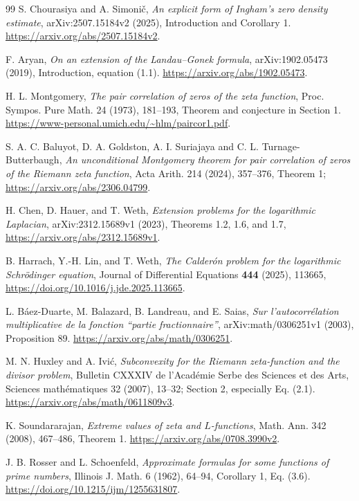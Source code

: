 \documentclass[11pt]{article}
\theoremstyle{remark}
\begin{document}
\begin{thebibliography}{99}
S. Chourasiya and A. Simoni\v{c},
\emph{An explicit form of Ingham's zero density estimate},
arXiv:2507.15184v2 (2025), Introduction and Corollary 1.
\url{https://arxiv.org/abs/2507.15184v2}.

F. Aryan, \emph{On an extension of the Landau--Gonek formula},
arXiv:1902.05473 (2019), Introduction, equation (1.1).
\url{https://arxiv.org/abs/1902.05473}.

H. L. Montgomery, \emph{The pair correlation of zeros of the zeta
function}, Proc. Sympos. Pure Math. 24 (1973), 181--193,
Theorem and conjecture in Section 1.
\url{https://www-personal.umich.edu/~hlm/paircor1.pdf}.

S. A. C. Baluyot, D. A. Goldston, A. I. Suriajaya and
C. L. Turnage-Butterbaugh,
\emph{An unconditional Montgomery theorem for pair correlation of
zeros of the Riemann zeta function}, Acta Arith. 214 (2024), 357--376,
Theorem 1; \url{https://arxiv.org/abs/2306.04799}.

H. Chen, D. Hauer, and T. Weth,
\emph{Extension problems for the logarithmic Laplacian},
arXiv:2312.15689v1 (2023), Theorems 1.2, 1.6, and 1.7,
\url{https://arxiv.org/abs/2312.15689v1}.

B. Harrach, Y.-H. Lin, and T. Weth,
\emph{The Calder\'on problem for the logarithmic Schr\"odinger equation},
Journal of Differential Equations \textbf{444} (2025), 113665,
\url{https://doi.org/10.1016/j.jde.2025.113665}.


L. B\'aez-Duarte, M. Balazard, B. Landreau, and E. Saias,
\emph{Sur l'autocorr\'elation multiplicative de la fonction
``partie fractionnaire''}, arXiv:math/0306251v1 (2003), Proposition 89.
\url{https://arxiv.org/abs/math/0306251}.

M. N. Huxley and A. Ivi\'c,
\emph{Subconvexity for the Riemann zeta-function and the divisor problem},
Bulletin CXXXIV de l'Acad\'emie Serbe des Sciences et des Arts,
Sciences math\'ematiques 32 (2007), 13--32; Section 2, especially Eq. (2.1).
\url{https://arxiv.org/abs/math/0611809v3}.

K. Soundararajan, \emph{Extreme values of zeta and $L$-functions},
Math. Ann. 342 (2008), 467--486, Theorem 1.
\url{https://arxiv.org/abs/0708.3990v2}.


J. B. Rosser and L. Schoenfeld,
\emph{Approximate formulas for some functions of prime numbers},
Illinois J. Math. 6 (1962), 64--94, Corollary 1, Eq. (3.6).
\url{https://doi.org/10.1215/ijm/1255631807}.


\end{thebibliography}
\end{document}
